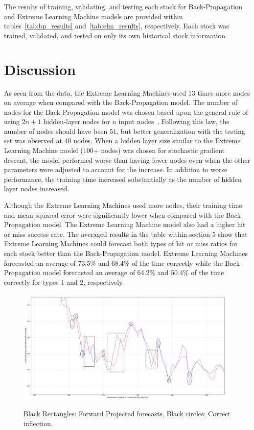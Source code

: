 \documentclass{ncjms}
\begin{document}
	The results of training, validating, and testing each stock for Back-Propagation and Extreme Learning Machine models are provided within tables\ \ref{tab:bp_results} and\ \ref{tab:elm_results}, respectively.
	Each stock was trained, validated, and tested on only its own historical stock information.

	\section{Discussion}\label{sec:discussion}
	As seen from the data, the Extreme Learning Machines used 13 times more nodes on average when compared with the Back-Propagation model.
	The number of nodes for the Back-Propagation model was chosen based upon the general rule of using $2n+1$ hidden-layer nodes for $n$ input nodes\ \citep{Tikhomirov:1991}.
	Following this law, the number of nodes should have been $51$, but better generalization with the testing set was observed at $40$ nodes.
	When a hidden layer size similar to  the Extreme Learning Machine model ($100$+ nodes) was chosen for stochastic gradient descent, the model performed worse than having fewer nodes even when the other parameters were adjusted to account for the increase.
	In addition to worse performance, the training time increased substantially as the number of hidden layer nodes increased.

	Although the Extreme Learning Machines used more nodes, their training time and mean-squared error were significantly lower when compared with the Back-Propagation model.
	The Extreme Learning Machine model also had a higher hit or miss success rate.
	The averaged results in the table within section 5 show that Extreme Learning Machines could forecast both types of hit or miss ratios for each stock better than the Back-Propagation model.
	Extreme Learning Machines forecasted an average of 73.5\% and 68.4\% of the time correctly while the Back-Propagation model forecasted an average of 64.2\% and 50.4\% of the time correctly for types 1 and 2, respectively.

	\begin{figure}
		\begin{center}
		\resizebox{\textwidth}{!} {
		\includegraphics{figure_projecting_prices}}
		\caption{ Black Rectangles: Forward Projected forecasts, Black circles: Correct inflection. }
		\label{projected_prices}
		\end{center}
	\end{figure}
\end{document}
